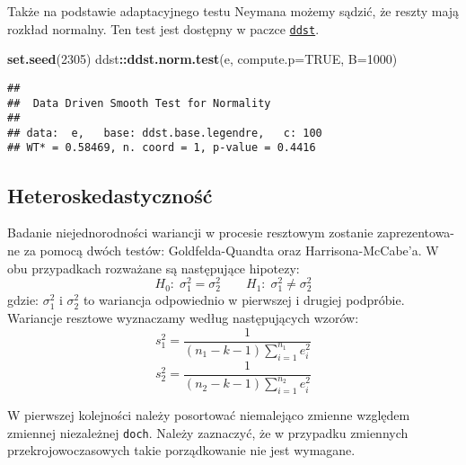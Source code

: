 \documentclass[polish,]{book}
\newenvironment{Shaded}{\begin{snugshade}}{\end{snugshade}}
\newcommand{\DataTypeTok}[1]{\textcolor[rgb]{0.13,0.29,0.53}{#1}}
\newcommand{\DecValTok}[1]{\textcolor[rgb]{0.00,0.00,0.81}{#1}}
\newcommand{\KeywordTok}[1]{\textcolor[rgb]{0.13,0.29,0.53}{\textbf{#1}}}
\newcommand{\NormalTok}[1]{#1}
\newcommand{\OperatorTok}[1]{\textcolor[rgb]{0.81,0.36,0.00}{\textbf{#1}}}
\newcommand{\OtherTok}[1]{\textcolor[rgb]{0.56,0.35,0.01}{#1}}
\begin{document}
Także na podstawie adaptacyjnego testu Neymana możemy sądzić, że reszty mają
rozkład normalny. Ten test jest dostępny w paczce \href{https://rdrr.io/cran/ddst/}{\texttt{ddst}}.

\begin{Shaded}
\begin{Highlighting}[]
\KeywordTok{set.seed}\NormalTok{(}\DecValTok{2305}\NormalTok{)}
\NormalTok{ddst}\OperatorTok{::}\KeywordTok{ddst.norm.test}\NormalTok{(e, }\DataTypeTok{compute.p=}\OtherTok{TRUE}\NormalTok{, }\DataTypeTok{B=}\DecValTok{1000}\NormalTok{)}
\end{Highlighting}
\end{Shaded}

\begin{verbatim}
## 
##  Data Driven Smooth Test for Normality
## 
## data:  e,   base: ddst.base.legendre,   c: 100
## WT* = 0.58469, n. coord = 1, p-value = 0.4416
\end{verbatim}

\hypertarget{part_13.2.4}{%
\subsection{Heteroskedastyczność}\label{part_13.2.4}}

Badanie niejednorodności wariancji w procesie resztowym zostanie zaprezentowa-
ne za pomocą dwóch testów: Goldfelda-Quandta oraz Harrisona-McCabe'a. W obu
przypadkach rozważane są następujące hipotezy:
\[
H_0:\;\sigma^2_1=\sigma^2_2\quad\quad H_1:\;\sigma^2_1\neq \sigma^2_2
\]
gdzie: \(\sigma^2_1\) i \(\sigma^2_2\) to wariancja odpowiednio w pierwszej i drugiej podpróbie. Wariancje resztowe wyznaczamy według następujących wzorów:
\begin{equation}
s_1^2=\frac{1}{(n_1-k-1)\sum_{i=1}^{n_1}e_i^2}
\label{eq:wz1314a}
\end{equation}
\begin{equation}
s_2^2=\frac{1}{(n_2-k-1)\sum_{i=1}^{n_2}e_i^2}
\label{eq:wz1314b}
\end{equation}

W pierwszej kolejności należy posortować niemalejąco zmienne względem zmiennej niezależnej \texttt{doch}. Należy zaznaczyć, że w przypadku zmiennych przekrojowoczasowych takie porządkowanie nie jest wymagane.
\end{document}
